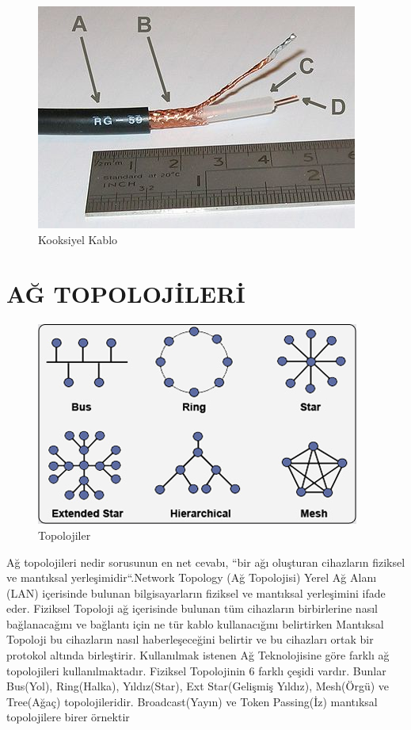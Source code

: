   \begin{figure}[!ht]
     \includegraphics{images/400px-RG-59}
    \caption{Kooksiyel Kablo}
     \label{fig:kooksiyel_kablo}
  \end{figure}


 \section*{AĞ TOPOLOJİLERİ }
\begin{figure}[!ht]
    \includegraphics{images/62_ağ_topolojisi}
   \caption{Topolojiler}
    \label{fig:topolojiler}
 \end{figure}
Ağ topolojileri nedir sorusunun en net cevabı, “bir ağı oluşturan cihazların fiziksel ve mantıksal yerleşimidir“.Network Topology (Ağ Topolojisi) Yerel Ağ Alanı (LAN) içerisinde bulunan bilgisayarların fiziksel ve mantıksal yerleşimini ifade eder. Fiziksel Topoloji ağ içerisinde bulunan tüm cihazların birbirlerine nasıl bağlanacağını ve bağlantı için ne tür kablo kullanacığını belirtirken Mantıksal Topoloji bu cihazların nasıl haberleşeceğini belirtir ve bu cihazları ortak bir protokol altında birleştirir. Kullanılmak istenen Ağ Teknolojisine göre farklı ağ topolojileri kullanılmaktadır.
Fiziksel Topolojinin 6 farklı çeşidi vardır. Bunlar Bus(Yol), Ring(Halka), Yıldız(Star), Ext Star(Gelişmiş Yıldız), Mesh(Örgü) ve Tree(Ağaç) topolojileridir. Broadcast(Yayın) ve Token Passing(İz) mantıksal topolojilere birer örnektir 

